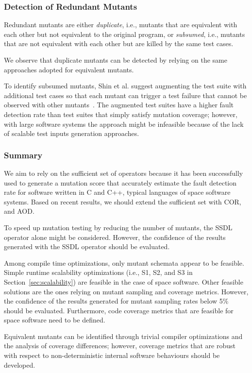 \subsubsection{Detection of Redundant Mutants}

Redundant mutants are either \emph{duplicate}, i.e., mutants that are equivalent with each other but not equivalent to the original program, or \emph{subsumed}, i.e., mutants that are not equivalent with each other but are killed by the same test cases. 

We observe that duplicate mutants can be detected by relying on the same approaches adopted for equivalent mutants. 

To identify subsumed mutants, Shin et al. suggest augmenting the test suite with additional test cases so that each mutant can trigger a test failure that cannot be observed with other mutants~\cite{Shin:TSE:DCriterion:2018}. 
The augmented test suites have a higher
 fault detection rate than test suites that simply satisfy mutation coverage; however, with large software systems the approach might be infeasible because of the lack of scalable test inputs generation approaches.


\subsubsection{Summary}

We aim to rely on the sufficient set of operators because it has been successfully used to generate a mutation score that accurately estimate the fault detection rate for software written in C and C++, typical languages of space software systems.
Based on recent results, we should extend the sufficient set with COR, and AOD.

To speed up mutation testing by reducing the number of mutants, the SSDL operator alone might be considered. However, the confidence of the results generated with the SSDL operator should be evaluated.

Among compile time optimizations, only mutant schemata appear to be feasible.
Simple runtime scalability optimizations (i.e., S1, S2, and S3 in Section~\ref{sec:scalability}) are feasible in the case of space software. Other feasible solutions are the ones relying on mutant sampling and coverage metrics. However, the confidence of the results generated for mutant sampling rates below 5\% should be evaluated. Furthermore, code coverage metrics that are feasible for space software need to be defined.

Equivalent mutants can be identified through trivial compiler optimizations and the analysis of coverage differences; however, coverage metrics that are robust with respect to non-deterministic internal software behaviours should be developed. 

